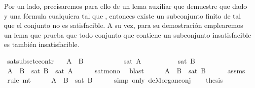 \begin{isabellebody}
\begin{isamarkuptext}
  Por un lado, precisaremos para ello de un lema auxiliar que demuestre que dado  y  una 
  fórmula cualquiera tal que , entonces existe un subconjunto finito  de  tal 
  que el conjunto  no es satisfacible. A su vez, para su demostración emplearemos un lema 
  que prueba que todo conjunto que contiene un subconjunto insatisfacible es también 
  insatisfacible.%
\end{isamarkuptext}\isamarkuptrue%
\isamarkupfalse%
\ sat{\isacharunderscore}subset{\isacharunderscore}ccontr{\isacharcolon}\isanewline
\ \ \ {\isachardoublequoteopen}A\ {\isasymsubseteq}\ B{\isachardoublequoteclose}\isanewline
\ \ \ \ \ \ \ \ \ \ {\isachardoublequoteopen}{\isasymnot}\ sat\ A{\isachardoublequoteclose}\isanewline
\ \ \ \ \ \ \ \ \ {\isachardoublequoteopen}{\isasymnot}\ sat\ B{\isachardoublequoteclose}\isanewline
%
\isadelimproof
%
\endisadelimproof
%
\isatagproof
{}\isamarkupfalse%
\ {\isacharminus}\isanewline
\ \ \isamarkupfalse%
\ {\isachardoublequoteopen}A\ {\isasymsubseteq}\ B\ {\isasymand}\ sat\ B\ {\isasymlongrightarrow}\ sat\ A{\isachardoublequoteclose}\isanewline
\ \ \ \ \isamarkupfalse%
\ sat{\isacharunderscore}mono\ \isamarkupfalse%
\ blast\isanewline
\ \ \isamarkupfalse%
\ \isamarkupfalse%
\ {\isachardoublequoteopen}{\isasymnot}{\isacharparenleft}A\ {\isasymsubseteq}\ B\ {\isasymand}\ sat\ B{\isacharparenright}{\isachardoublequoteclose}\isanewline
\ \ \ \ \isamarkupfalse%
\ assms{\isacharparenleft}{}{\isacharparenright}\ \isamarkupfalse%
\ {\isacharparenleft}rule\ mt{\isacharparenright}\isanewline
\ \ \isamarkupfalse%
\ \isamarkupfalse%
\ {\isachardoublequoteopen}{\isasymnot}{\isacharparenleft}A\ {\isasymsubseteq}\ B{\isacharparenright}\ {\isasymor}\ {\isasymnot}{\isacharparenleft}sat\ B{\isacharparenright}{\isachardoublequoteclose}\isanewline
\ \ \ \ \isamarkupfalse%
\ {\isacharparenleft}simp\ only{\isacharcolon}\ de{\isacharunderscore}Morgan{\isacharunderscore}conj{\isacharparenright}\isanewline
\ \ \isamarkupfalse%
\ {\isacharquery}thesis\isanewline
\ \ \isamarkupfalse%

\end{isabellebody}
